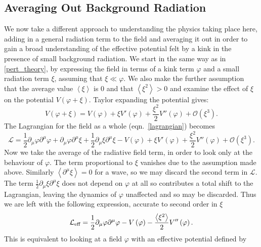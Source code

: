 \documentclass[11pt, oneside]{article}  	%
\numberwithin{equation}{section}
\begin{document}
\subsection{Averaging Out Background Radiation} \label{avg_out}
We now take a different approach to understanding the physics taking place here,  adding in a general radiation term to the field and averaging it out in order to gain a broad understanding of the effective potential felt by a kink in the presence of small background radiation. We start in the same way as in \textsection \ref{pert_theory}, by expressing the field in terms of a kink term $\varphi$ and a small radiation term $\xi$, assuming that $\xi \ll \varphi$. We also make the further assumption that the average value $\left \langle\xi\right \rangle$ is 0 and that $\left \langle\xi ^ 2\right \rangle > 0$ and examine the effect of $\xi$ on the potential $V(\varphi+\xi)$. Taylor expanding the potential gives:
\begin{equation}
V\left ( \varphi+\xi \right ) = V\left ( \varphi \right ) + \xi V'\left ( \varphi \right ) + \frac{\xi^2}{2}V''\left ( \varphi \right ) + \mathcal{O}(\xi^3).
\end{equation}
The Lagrangian for the field as a whole (eqn.~\ref{lagrangian}) becomes
\begin{equation}
\mathcal{L} = \frac{1}{2} \partial_\mu \varphi \partial^\mu \varphi + \partial_\mu \varphi \partial^\mu \xi + \frac{1}{2} \partial_\mu \xi\partial^\mu \xi- V\left ( \varphi \right ) + \xi V'\left ( \varphi \right ) + \frac{\xi^2}{2}V''\left ( \varphi \right ) + \mathcal{O}(\xi^3).
\end{equation} 
Now we take the average of the radiative field term, in order to look only at the behaviour of $\varphi$. The term proportional to $\xi$ vanishes due to the assumption made above. Similarly $\left \langle \partial^\mu \xi\right \rangle = 0$ for a wave, so we may discard the second term in $\mathcal{L}$. The term $ \frac{1}{2} \partial_\mu \xi\partial^\mu \xi$ does not depend on $\varphi$ at all so contributes a total shift to the Lagrangian, leaving the dynamics of $\varphi$ unaffected and so may be discarded. Thus we are left with the following expression, accurate to second order in $\xi$ 
\begin{equation}
\mathcal{L}_{\textup{eff}} = \frac{1}{2} \partial_\mu \varphi \partial^\mu \varphi - V\left ( \varphi \right ) - \frac{\left \langle \xi^2 \right \rangle}{2}V''\left ( \varphi \right ) .
\end{equation} 
This is equivalent to looking at a field $\varphi$ with an effective potential defined by
\end{document}
